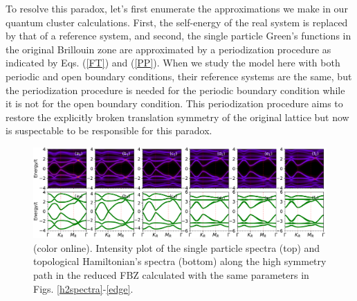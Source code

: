 \documentclass[12pt]{iopart}
\begin{document}
\par To resolve this paradox, let's first enumerate the approximations we make in our quantum cluster calculations. First, the self-energy of the real system is replaced by that of a reference system, and second, the single particle Green's functions in the original Brillouin zone are approximated by a periodization procedure as indicated by Eqs. (\ref{FT}) and (\ref{PP}). When we study the model here with both periodic and open boundary conditions, their reference systems are the same, but the periodization procedure is needed for the periodic boundary condition while it is not for the open boundary condition. This periodization procedure aims to restore the explicitly broken translation symmetry of the original lattice but now is suspectable to be responsible for this paradox.

\begin{figure}
\centering
\includegraphics[scale=0.45]{h6spectra}
\caption{(color online). Intensity plot of the single particle spectra (top) and topological Hamiltonian's spectra (bottom) along the high symmetry path in the reduced FBZ calculated with the same parameters in Figs. \ref{h2spectra}-\ref{edge}.}\label{h6spectra}
\end{figure}
\end{document}
